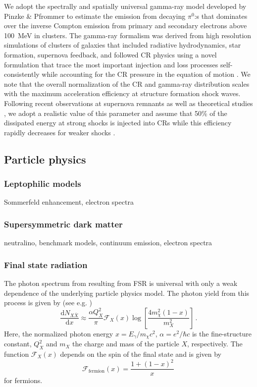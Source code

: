 \documentclass[10pt,aps,pra,reprint,amsmath,amsfonts,amssymb,showpacs]{revtex4-1}
\newcommand{\rmn}{\mathrm}
\newcommand{\dd}{\rmn{d}}
\newcommand{\eg}{E_\gamma}
\begin{document}
We adopt the spectrally and spatially universal gamma-ray model
developed by Pinzke \& Pfrommer \cite{2010MNRAS.409..449P} to estimate
the emission from decaying $\pi^0$:s that dominates over the inverse
Compton emission from primary and secondary electrons above 100~MeV in
clusters. The gamma-ray formalism was derived from high resolution
simulations of clusters of galaxies that included radiative
hydrodynamics, star formation, supernova feedback, and followed CR
physics using a novel formulation that trace the most important
injection and loss processes self-consistently while accounting for
the CR pressure in the equation of motion
\cite{2008A&A...481...33J,2007A&A...473...41E,2006MNRAS.367..113P}.
We note that the overall normalization of the CR and gamma-ray
distribution scales with the maximum acceleration efficiency at
structure formation shock waves. Following recent observations at
supernova remnants \cite{2009Sci...325..719H} as well as theoretical
studies \cite{2005ApJ...620...44K}, we adopt a realistic value of this
parameter and assume that 50\% of the dissipated energy at strong
shocks is injected into CRs while this efficiency rapidly decreases
for weaker shocks \cite{2007A&A...473...41E}.
 

\subsection{Particle physics}
\label{sect:PF}

\subsubsection{Leptophilic models}
\label{sect:LP}
Sommerfeld enhancement, electron spectra

\subsubsection{Supersymmetric dark matter}
neutralino, benchmark models, continuum emission, electron spectra 

\subsubsection{Final state radiation}
The photon spectrum from resulting from FSR is universal with only a
weak dependence of the underlying particle physics model. The photon
yield from this process is given by (see
e.g. \cite{2008JHEP...01..049B})
\begin{equation}
\frac{\dd N_{X \bar{X}}}{\dd x} \approx \frac{\alpha Q_X^2}{\pi}
\mathcal{F}_X(x) \log\left[\frac{4 m_\chi^2\left(1-x\right)}{m_X^2}\right]\,.
\end{equation}
Here, the normalized photon energy $x=\eg/m_\chi c^2$, $\alpha =
e^2/\hbar c$ is the fine-structure constant, $Q_X^2$ and $m_X$ the
charge and mass of the particle $X$, respectively. The function
$\mathcal{F}_X(x)$ depends on the spin of the final state and is given
by
\begin{equation}
\mathcal{F}_\rmn{fermion}(x) = \frac{1+\left(1-x\right)^2}{x}\,
\end{equation}
for fermions. 
\end{document}
